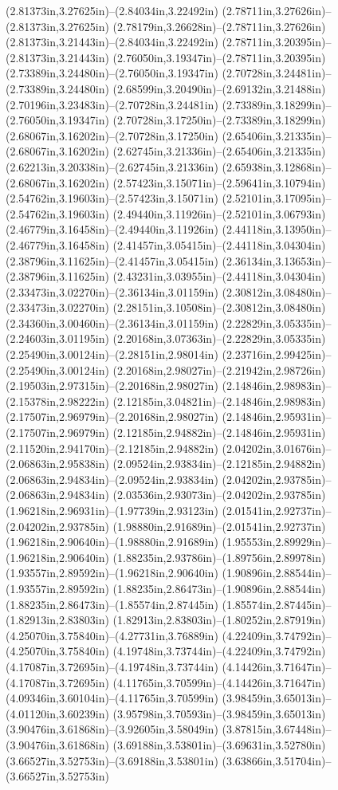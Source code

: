(2.81373in,3.27625in)--(2.84034in,3.22492in) (2.78711in,3.27626in)--(2.81373in,3.27625in) (2.78179in,3.26628in)--(2.78711in,3.27626in) (2.81373in,3.21443in)--(2.84034in,3.22492in) (2.78711in,3.20395in)--(2.81373in,3.21443in) (2.76050in,3.19347in)--(2.78711in,3.20395in) (2.73389in,3.24480in)--(2.76050in,3.19347in) (2.70728in,3.24481in)--(2.73389in,3.24480in) (2.68599in,3.20490in)--(2.69132in,3.21488in) (2.70196in,3.23483in)--(2.70728in,3.24481in) (2.73389in,3.18299in)--(2.76050in,3.19347in) (2.70728in,3.17250in)--(2.73389in,3.18299in) (2.68067in,3.16202in)--(2.70728in,3.17250in) (2.65406in,3.21335in)--(2.68067in,3.16202in) (2.62745in,3.21336in)--(2.65406in,3.21335in) (2.62213in,3.20338in)--(2.62745in,3.21336in) (2.65938in,3.12868in)--(2.68067in,3.16202in) (2.57423in,3.15071in)--(2.59641in,3.10794in) (2.54762in,3.19603in)--(2.57423in,3.15071in) (2.52101in,3.17095in)--(2.54762in,3.19603in) (2.49440in,3.11926in)--(2.52101in,3.06793in) (2.46779in,3.16458in)--(2.49440in,3.11926in) (2.44118in,3.13950in)--(2.46779in,3.16458in) (2.41457in,3.05415in)--(2.44118in,3.04304in) (2.38796in,3.11625in)--(2.41457in,3.05415in) (2.36134in,3.13653in)--(2.38796in,3.11625in) (2.43231in,3.03955in)--(2.44118in,3.04304in) (2.33473in,3.02270in)--(2.36134in,3.01159in) (2.30812in,3.08480in)--(2.33473in,3.02270in) (2.28151in,3.10508in)--(2.30812in,3.08480in) (2.34360in,3.00460in)--(2.36134in,3.01159in) (2.22829in,3.05335in)--(2.24603in,3.01195in) (2.20168in,3.07363in)--(2.22829in,3.05335in) (2.25490in,3.00124in)--(2.28151in,2.98014in) (2.23716in,2.99425in)--(2.25490in,3.00124in) (2.20168in,2.98027in)--(2.21942in,2.98726in) (2.19503in,2.97315in)--(2.20168in,2.98027in) (2.14846in,2.98983in)--(2.15378in,2.98222in) (2.12185in,3.04821in)--(2.14846in,2.98983in) (2.17507in,2.96979in)--(2.20168in,2.98027in) (2.14846in,2.95931in)--(2.17507in,2.96979in) (2.12185in,2.94882in)--(2.14846in,2.95931in) (2.11520in,2.94170in)--(2.12185in,2.94882in) (2.04202in,3.01676in)--(2.06863in,2.95838in) (2.09524in,2.93834in)--(2.12185in,2.94882in) (2.06863in,2.94834in)--(2.09524in,2.93834in) (2.04202in,2.93785in)--(2.06863in,2.94834in) (2.03536in,2.93073in)--(2.04202in,2.93785in) (1.96218in,2.96931in)--(1.97739in,2.93123in) (2.01541in,2.92737in)--(2.04202in,2.93785in) (1.98880in,2.91689in)--(2.01541in,2.92737in) (1.96218in,2.90640in)--(1.98880in,2.91689in) (1.95553in,2.89929in)--(1.96218in,2.90640in) (1.88235in,2.93786in)--(1.89756in,2.89978in) (1.93557in,2.89592in)--(1.96218in,2.90640in) (1.90896in,2.88544in)--(1.93557in,2.89592in) (1.88235in,2.86473in)--(1.90896in,2.88544in) (1.88235in,2.86473in)--(1.85574in,2.87445in) (1.85574in,2.87445in)--(1.82913in,2.83803in) (1.82913in,2.83803in)--(1.80252in,2.87919in) (4.25070in,3.75840in)--(4.27731in,3.76889in) (4.22409in,3.74792in)--(4.25070in,3.75840in) (4.19748in,3.73744in)--(4.22409in,3.74792in) (4.17087in,3.72695in)--(4.19748in,3.73744in) (4.14426in,3.71647in)--(4.17087in,3.72695in) (4.11765in,3.70599in)--(4.14426in,3.71647in) (4.09346in,3.60104in)--(4.11765in,3.70599in) (3.98459in,3.65013in)--(4.01120in,3.60239in) (3.95798in,3.70593in)--(3.98459in,3.65013in) (3.90476in,3.61868in)--(3.92605in,3.58049in) (3.87815in,3.67448in)--(3.90476in,3.61868in) (3.69188in,3.53801in)--(3.69631in,3.52780in) (3.66527in,3.52753in)--(3.69188in,3.53801in) (3.63866in,3.51704in)--(3.66527in,3.52753in) 